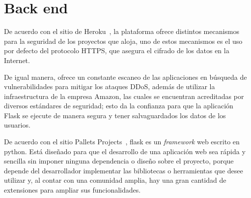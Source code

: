 \section{Back end}


De acuerdo con el sitio de Heroku~\cite{heroku_heroku_2020}, la plataforma ofrece distintos mecanismos para la seguridad de los proyectos que aloja, uno de estos mecanismos es el uso por defecto del protocolo HTTPS, que asegura el cifrado de los datos en la Internet.

De igual manera, ofrece un constante escaneo de las aplicaciones en búsqueda de vulnerabilidades para mitigar los ataques DDoS, además de utilizar la infraestructura de la empresa Amazon, las cuales se encuentran acreditadas por diversos estándares de seguridad; esto da la confianza para que la aplicación Flask se ejecute de manera segura y tener salvaguardados los datos de los usuarios.

De acuerdo con el sitio Pallets Projects~\cite{noauthor_pallets_2020}, flask es un \textit{framework} web escrito en python. Está diseñado para que el desarrollo de una aplicación web sea rápida y sencilla sin imponer ninguna dependencia o diseño sobre el proyecto, porque depende del desarrollador implementar las bibliotecas o herramientas que desee utilizar y, al contar con una comunidad amplia, hay una gran cantidad de extensiones para ampliar sus funcionalidades.